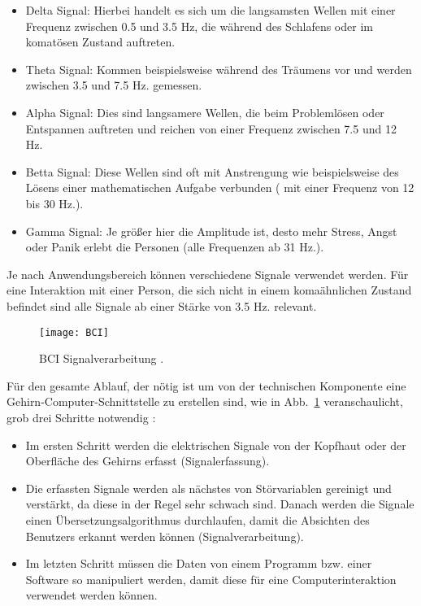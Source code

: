 \begin{itemize}
      \item Delta Signal: Hierbei handelt es sich um die langsamsten Wellen mit einer Frequenz zwischen 0.5 und 3.5 Hz, die während des Schlafens oder im komatösen Zustand auftreten.
      \item Theta Signal: Kommen beispielsweise während des Träumens vor und werden zwischen 3.5 und 7.5 Hz. gemessen.
			\item Alpha Signal: Dies sind langsamere Wellen, die beim Problemlösen oder Entspannen auftreten und reichen von einer Frequenz zwischen 7.5 und 12 Hz.
			\item Betta Signal: Diese Wellen sind oft mit Anstrengung wie beispielsweise des Lösens einer mathematischen Aufgabe verbunden ( mit einer Frequenz von 12 bis 30 Hz.).
      \item Gamma Signal: Je größer hier die Amplitude ist, desto mehr Stress, Angst oder Panik erlebt die Personen (alle Frequenzen ab 31 Hz.).
\end{itemize}
Je nach Anwendungsbereich können verschiedene Signale verwendet werden. Für eine Interaktion mit einer Person, die sich nicht in einem komaähnlichen Zustand befindet sind alle Signale ab einer Stärke von 3.5 Hz. relevant.
\newline \newline
%
%
\begin{figure}
\centering
\texttt{[image: BCI]}
\caption{BCI Signalverarbeitung \cite{BRAIN}.}
\label{fig:BCI}
\end{figure}
%
%
Für den gesamte Ablauf, der nötig ist um von der technischen Komponente eine Gehirn-Computer-Schnittstelle zu erstellen sind, wie in Abb.~\ref{fig:BCI} veranschaulicht, grob drei Schritte notwendig \cite{BRAIN}:
\begin{itemize}
      \item Im ersten Schritt werden die elektrischen Signale von der Kopfhaut oder der Oberfläche des Gehirns erfasst (Signalerfassung).
      \item Die erfassten Signale werden als nächstes von Störvariablen gereinigt und verstärkt, da diese in der Regel sehr schwach sind. Danach werden die Signale einen Übersetzungsalgorithmus durchlaufen, damit die Absichten des Benutzers erkannt werden können (Signalverarbeitung).
			\item Im letzten Schritt müssen die Daten von einem Programm bzw. einer Software so manipuliert werden, damit diese für eine Computerinteraktion verwendet werden können.
\end{itemize}
